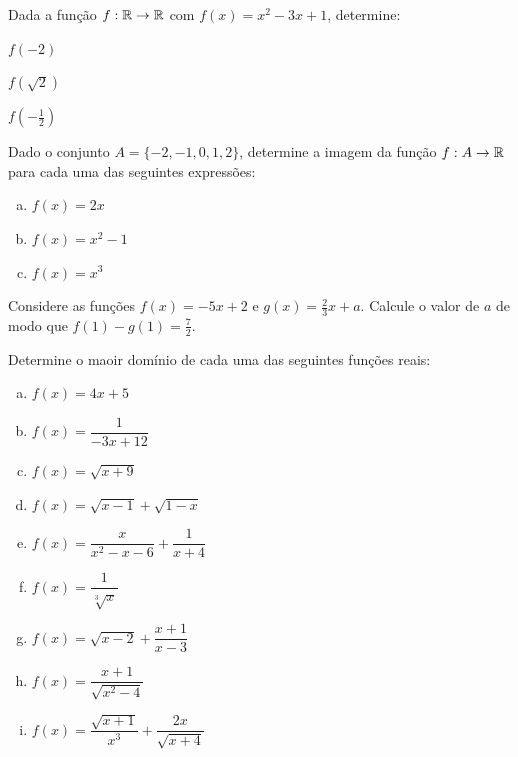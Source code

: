 \begin{secExercicios}
    \begin{exer}
        Dada a função $f:\mathbb{R}\to\mathbb{R}$ com $f(x)=x^2-3x+1$, determine:
        \begin{enumerate}[a)]
            \begin{multicols}{3}
                \item $f(-2)$
                \item $f(\sqrt{2})$
                \item $f\left(-\frac{1}{2}\right)$
            \end{multicols}
        \end{enumerate}
    \end{exer}

    \begin{exer}
        Dado o conjunto $A=\{-2,-1,0,1,2\}$, determine a imagem da função $f:A\to\mathbb{R}$ para cada uma das seguintes expressões:
        \begin{enumerate}[a)]
            \item $f(x)=2x$
            \item $f(x)=x^2-1$
            \item $f(x)=x^3$
        \end{enumerate}
    \end{exer}

    \begin{exer}
        Considere as funções $f(x)=-5x+2$ e $g(x)=\frac{2}{3}x+a$. Calcule o valor de $a$ de modo que $f(1)-g(1)=\frac{7}{2}$.
    \end{exer}

    \begin{exer}
        Determine o maoir domínio de cada uma das seguintes funções reais:
        \begin{enumerate}[a)]
            \item $f(x)=4x+5$
            \item $f(x)=\dfrac{1}{-3x+12}$
            \item $f(x)=\sqrt{x+9}$
            \item $f(x)=\sqrt{x-1}+\sqrt{1-x}$
            \item $f(x)=\dfrac{x}{x^2-x-6}+\dfrac{1}{x+4}$
            \item $f(x)= \dfrac{1}{\sqrt[3]{x}}$
            \item $f(x)=\sqrt{x-2}+\dfrac{x+1}{x-3}$
            \item $f(x)=\dfrac{x+1}{\sqrt{x^2-4}}$
            \item $f(x)=\dfrac{\sqrt{x+1}}{x^3} + \dfrac{2x}{\sqrt{x+4}}$
        \end{enumerate}
    \end{exer}
    

\end{secExercicios}
